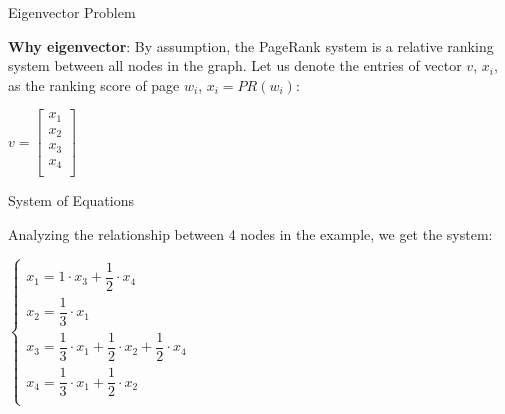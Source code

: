 \documentclass{beamer}
\begin{document}

\begin{frame}[t]{Eigenvector Problem}
\begin{outline}
    \1 \textbf{Why eigenvector}: By assumption, the PageRank system is a relative ranking system between all nodes in the graph. 
    \1 Let us denote the entries of vector $v$, $x_i$, as the ranking score of page $w_i$, $x_i = PR(w_i)$:

    \begin{center}
        $v = \begin{bmatrix}
            x_1\\
            x_2\\
            x_3\\
            x_4\\
        \end{bmatrix}$
    \end{center}
\end{outline}
\end{frame}

\begin{frame}[t]{System of Equations}
\begin{outline}
    \1 Analyzing the relationship between 4 nodes in the example, we get the system:

    \begin{center}
        $\begin{cases}
            x_1 = 1 \cdot x_3 + \dfrac{1}{2}\cdot x_4&\\[6pt]
            x_2 = \dfrac{1}{3}\cdot x_1&\\[6pt]
            x_3 = \dfrac{1}{3}\cdot x_1 + \dfrac{1}{2}\cdot x_2 + \dfrac{1}{2}\cdot x_4&\\[6pt]
            x_4 = \dfrac{1}{3}\cdot x_1 + \dfrac{1}{2}\cdot x_2&\\[6pt]
        \end{cases}$
    \end{center}
\end{outline}
\end{frame}
\end{document}

